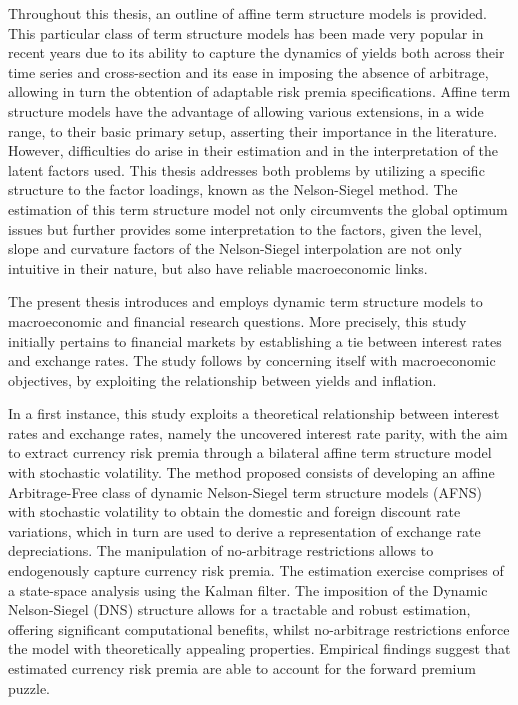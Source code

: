Throughout this thesis, an outline of affine term structure models is provided. This particular class of term structure models has been made very popular in recent years due to its ability to capture the dynamics of yields both across their time series and cross-section and its ease in imposing the absence of arbitrage, allowing in turn the obtention of adaptable risk premia specifications. Affine term structure models have the advantage of allowing various extensions, in a wide range, to their basic primary setup, asserting their importance in the literature. However, difficulties do arise in their estimation and in the interpretation of the latent factors used. This thesis addresses both problems by utilizing a specific structure to the factor loadings, known as the Nelson-Siegel method. The estimation of this term structure model not only circumvents the global optimum issues but further provides some interpretation to the factors, given the level, slope and curvature factors of the Nelson-Siegel interpolation are not only intuitive in their nature, but also have reliable macroeconomic links.  %

The present thesis introduces and employs dynamic term structure models to macroeconomic and financial research questions. More precisely, this study initially pertains to financial markets by establishing a tie between interest rates and exchange rates. The study follows by concerning itself with macroeconomic objectives, by exploiting the relationship between yields and inflation.

In a first instance, this study exploits a theoretical relationship between interest rates and exchange rates, namely the uncovered interest rate parity, with the aim to extract currency risk premia through a bilateral affine term structure model with stochastic volatility. The method proposed consists of developing an affine Arbitrage-Free class of dynamic Nelson-Siegel term structure models (AFNS) with stochastic volatility to obtain the domestic and foreign discount rate variations, which in turn are used to derive a representation of exchange rate depreciations. The manipulation of no-arbitrage restrictions allows to endogenously capture currency risk premia. The estimation exercise comprises of a state-space analysis using the Kalman filter. The imposition of the Dynamic Nelson-Siegel (DNS) structure allows for a tractable and robust estimation, offering significant computational benefits, whilst no-arbitrage restrictions enforce the model with theoretically appealing properties. Empirical findings suggest that estimated currency risk premia are able to account for the forward premium puzzle. 


